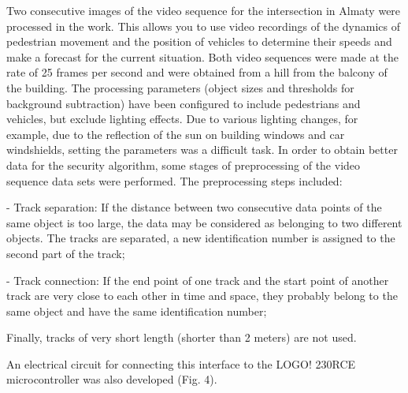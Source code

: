 \begin{multicols}{2}
Two consecutive images of the video sequence for the intersection in
Almaty were processed in the work. This allows you to use video
recordings of the dynamics of pedestrian movement and the position of
vehicles to determine their speeds and make a forecast for the current
situation. Both video sequences were made at the rate of 25 frames per
second and were obtained from a hill from the balcony of the building.
The processing parameters (object sizes and thresholds for background
subtraction) have been configured to include pedestrians and vehicles,
but exclude lighting effects. Due to various lighting changes, for
example, due to the reflection of the sun on building windows and car
windshields, setting the parameters was a difficult task. In order to
obtain better data for the security algorithm, some stages of
preprocessing of the video sequence data sets were performed. The
preprocessing steps included:

- Track separation: If the distance between two consecutive data points
of the same object is too large, the data may be considered as belonging
to two different objects. The tracks are separated, a new identification
number is assigned to the second part of the track;

- Track connection: If the end point of one track and the start point of
another track are very close to each other in time and space, they
probably belong to the same object and have the same identification
number;

Finally, tracks of very short length (shorter than 2 meters) are not
used.

An electrical circuit for connecting this interface to the LOGO! 230RCE
microcontroller was also developed (Fig. 4).
\end{multicols}

